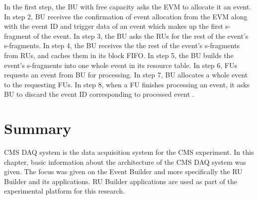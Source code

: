 In the first step, the BU with free capacity asks the EVM to allocate it an event. In step 2, BU receives the confirmation of event allocation from the EVM along with the event ID and trigger data of an event which makes up the first s-fragment of the event. In step 3, the BU asks the RUs for the rest of the event's s-fragments. In step 4, the BU receives the the rest of the event's s-fragments from RUs, and caches them in its block FIFO. In step 5, the BU builds the event's s-fragments into one whole event in its resource table. In step 6, FUs requests an event from BU for processing. In step 7, BU allocates a whole event to the requesting FUs. In step 8, when a FU finishes processing an event, it asks BU to discard the event ID corresponding to processed event \cite{rubuilder}.

\section{Summary}
CMS DAQ system is the data acquisition system for the CMS experiment. In this chapter, basic information about the architecture of the CMS DAQ system was given. The focus was given on the Event Builder and more specifically the RU Builder and its applications. RU Builder applications are used as part of the experimental platform for this research. 